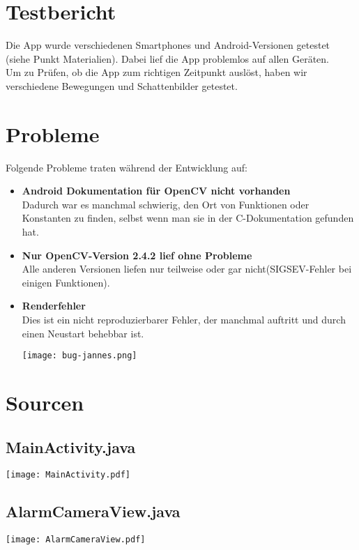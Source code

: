 \documentclass[11pt]{article}
\begin{document}
\section{Testbericht}
Die App wurde verschiedenen Smartphones und Android-Versionen getestet (siehe Punkt Materialien). Dabei lief die App problemlos auf allen Ger{\"a}ten. \\
Um zu Pr{\"u}fen, ob die App zum richtigen Zeitpunkt ausl{\"o}st, haben wir verschiedene Bewegungen und Schattenbilder getestet.
\section{Probleme}
Folgende Probleme traten w{\"a}hrend der Entwicklung auf:
\begin{itemize}
	\item {\bf Android Dokumentation f{\"u}r OpenCV nicht vorhanden}\\ Dadurch war es manchmal schwierig, den Ort von Funktionen oder Konstanten zu finden, selbst wenn man sie in der C-Dokumentation gefunden hat.
	\item {\bf Nur OpenCV-Version 2.4.2 lief ohne Probleme}\\ Alle anderen Versionen liefen nur teilweise oder gar nicht(SIGSEV-Fehler bei einigen Funktionen).
	\item {\bf Renderfehler}\\ Dies ist ein nicht reproduzierbarer Fehler, der manchmal auftritt und durch einen Neustart behebbar ist.\\
	\begin{center}
		\texttt{[image: bug-jannes.png]}
	\end{center}
\end{itemize}
\section{Sourcen}
\subsection{MainActivity.java}
\texttt{[image: MainActivity.pdf]}

\subsection{AlarmCameraView.java}
\texttt{[image: AlarmCameraView.pdf]}

\end{document}
